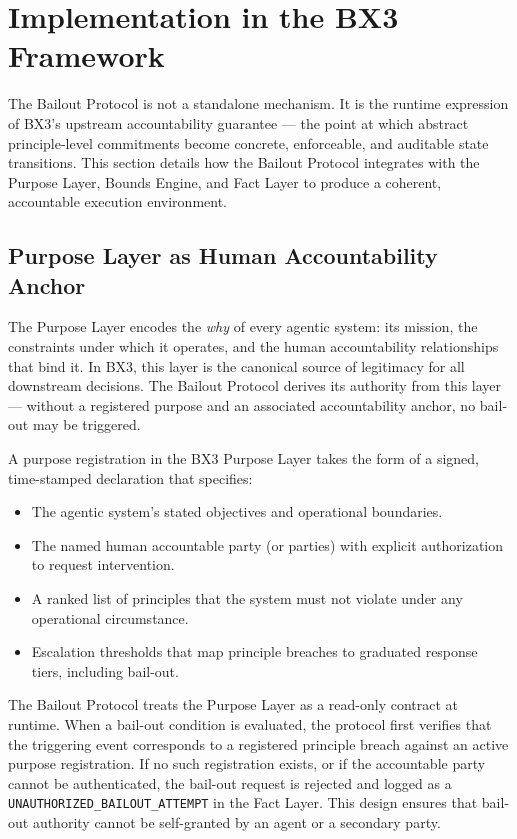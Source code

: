 \section{Implementation in the BX3 Framework}
\label{sec:bailout-implementation}

The Bailout Protocol is not a standalone mechanism. It is the runtime expression of BX3's upstream accountability guarantee — the point at which abstract principle-level commitments become concrete, enforceable, and auditable state transitions. This section details how the Bailout Protocol integrates with the Purpose Layer, Bounds Engine, and Fact Layer to produce a coherent, accountable execution environment.

\subsection{Purpose Layer as Human Accountability Anchor}
\label{sec:purpose-layer-anchor}

The Purpose Layer encodes the \textit{why} of every agentic system: its mission, the constraints under which it operates, and the human accountability relationships that bind it. In BX3, this layer is the canonical source of legitimacy for all downstream decisions. The Bailout Protocol derives its authority from this layer — without a registered purpose and an associated accountability anchor, no bail-out may be triggered.

A purpose registration in the BX3 Purpose Layer takes the form of a signed, time-stamped declaration that specifies:

\begin{itemize}
    \item The agentic system's stated objectives and operational boundaries.
    \item The named human accountable party (or parties) with explicit authorization to request intervention.
    \item A ranked list of principles that the system must not violate under any operational circumstance.
    \item Escalation thresholds that map principle breaches to graduated response tiers, including bail-out.
\end{itemize}

The Bailout Protocol treats the Purpose Layer as a read-only contract at runtime. When a bail-out condition is evaluated, the protocol first verifies that the triggering event corresponds to a registered principle breach against an active purpose registration. If no such registration exists, or if the accountable party cannot be authenticated, the bail-out request is rejected and logged as a \texttt{UNAUTHORIZED\_BAILOUT\_ATTEMPT} in the Fact Layer. This design ensures that bail-out authority cannot be self-granted by an agent or a secondary party.

